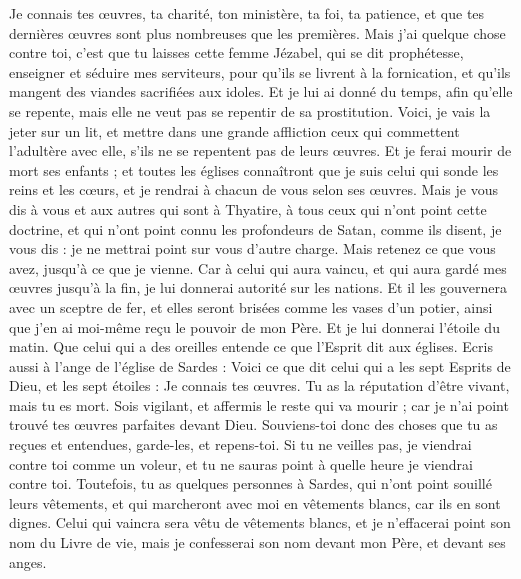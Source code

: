 \begin{multicols}{2}
Je connais tes œuvres, ta charité, ton ministère, ta foi, ta patience, et que tes dernières œuvres sont plus nombreuses que les premières.
Mais j'ai quelque chose contre toi, c'est que tu laisses cette femme Jézabel{}, qui se dit prophétesse, enseigner et séduire mes serviteurs, pour qu’ils se livrent à la fornication, et qu’ils mangent des viandes sacrifiées aux idoles.
Et je lui ai donné du temps, afin qu'elle se repente, mais elle ne veut pas se repentir de sa prostitution.
Voici, je vais la jeter sur un lit, et mettre dans une grande affliction ceux qui commettent l’adultère avec elle, s'ils ne se repentent pas de leurs œuvres.
Et je ferai mourir de mort ses enfants ; et toutes les églises connaîtront que je suis celui qui sonde les reins et les cœurs, et je rendrai à chacun de vous selon ses œuvres.
Mais je vous dis à vous et aux autres qui sont à Thyatire, à tous ceux qui n'ont point cette doctrine, et qui n'ont point connu les profondeurs de Satan, comme ils disent, je vous dis : je ne mettrai point sur vous d'autre charge.
Mais retenez ce que vous avez, jusqu'à ce que je vienne.
Car à celui qui aura vaincu, et qui aura gardé mes œuvres jusqu'à la fin, je lui donnerai autorité sur les nations.
Et il les gouvernera avec un sceptre de fer, et elles seront brisées comme les vases d'un potier, ainsi que j’en ai moi-même reçu le pouvoir de mon Père.
Et je lui donnerai l'étoile du matin.
Que celui qui a des oreilles entende ce que l'Esprit dit aux églises.
\VerseOne{}Ecris aussi à l'ange de l'église de Sardes : Voici ce que dit celui qui a les sept Esprits de Dieu, et les sept étoiles : Je connais tes œuvres. Tu as la réputation d’être vivant, mais tu es mort.
Sois vigilant, et affermis le reste qui va mourir ; car je n'ai point trouvé tes œuvres parfaites devant Dieu.
Souviens-toi donc des choses que tu as reçues et entendues, garde-les, et repens-toi. Si tu ne veilles pas, je viendrai contre toi comme un voleur, et tu ne sauras point à quelle heure je viendrai contre toi{}.
Toutefois, tu as quelques personnes à Sardes, qui n'ont point souillé leurs vêtements, et qui marcheront avec moi en vêtements blancs, car ils en sont dignes.
Celui qui vaincra sera vêtu de vêtements blancs, et je n'effacerai point son nom du Livre de vie, mais je confesserai son nom devant mon Père, et devant ses anges.

\end{multicols}
